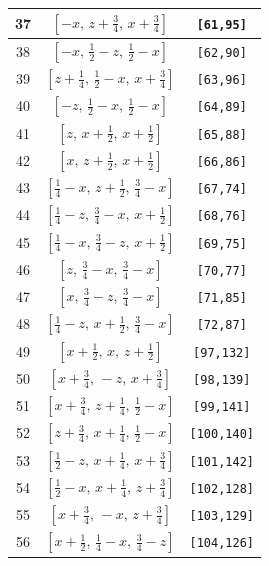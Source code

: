 \documentclass[fleqn,8pt]{jsarticle}
\begin{document}
\begin{longtable}{ccc}
37 & $\left[ - x,\, z + \frac{3}{4},\, x + \frac{3}{4} \right]$ & {\tt [61,95]} \\ \hline
38 & $\left[ - x,\, \frac{1}{2} - z,\, \frac{1}{2} - x \right]$ & {\tt [62,90]} \\ \hline
39 & $\left[ z + \frac{1}{4},\, \frac{1}{2} - x,\, x + \frac{3}{4} \right]$ & {\tt [63,96]} \\ \hline
40 & $\left[ - z,\, \frac{1}{2} - x,\, \frac{1}{2} - x \right]$ & {\tt [64,89]} \\ \hline
41 & $\left[ z,\, x + \frac{1}{2},\, x + \frac{1}{2} \right]$ & {\tt [65,88]} \\ \hline
42 & $\left[ x,\, z + \frac{1}{2},\, x + \frac{1}{2} \right]$ & {\tt [66,86]} \\ \hline
43 & $\left[ \frac{1}{4} - x,\, z + \frac{1}{2},\, \frac{3}{4} - x \right]$ & {\tt [67,74]} \\ \hline
44 & $\left[ \frac{1}{4} - z,\, \frac{3}{4} - x,\, x + \frac{1}{2} \right]$ & {\tt [68,76]} \\ \hline
45 & $\left[ \frac{1}{4} - x,\, \frac{3}{4} - z,\, x + \frac{1}{2} \right]$ & {\tt [69,75]} \\ \hline
46 & $\left[ z,\, \frac{3}{4} - x,\, \frac{3}{4} - x \right]$ & {\tt [70,77]} \\ \hline
47 & $\left[ x,\, \frac{3}{4} - z,\, \frac{3}{4} - x \right]$ & {\tt [71,85]} \\ \hline
48 & $\left[ \frac{1}{4} - z,\, x + \frac{1}{2},\, \frac{3}{4} - x \right]$ & {\tt [72,87]} \\ \hline
49 & $\left[ x + \frac{1}{2},\, x,\, z + \frac{1}{2} \right]$ & {\tt [97,132]} \\ \hline
50 & $\left[ x + \frac{3}{4},\, - z,\, x + \frac{3}{4} \right]$ & {\tt [98,139]} \\ \hline
51 & $\left[ x + \frac{3}{4},\, z + \frac{1}{4},\, \frac{1}{2} - x \right]$ & {\tt [99,141]} \\ \hline
52 & $\left[ z + \frac{3}{4},\, x + \frac{1}{4},\, \frac{1}{2} - x \right]$ & {\tt [100,140]} \\ \hline
53 & $\left[ \frac{1}{2} - z,\, x + \frac{1}{4},\, x + \frac{3}{4} \right]$ & {\tt [101,142]} \\ \hline
54 & $\left[ \frac{1}{2} - x,\, x + \frac{1}{4},\, z + \frac{3}{4} \right]$ & {\tt [102,128]} \\ \hline
55 & $\left[ x + \frac{3}{4},\, - x,\, z + \frac{3}{4} \right]$ & {\tt [103,129]} \\ \hline
56 & $\left[ x + \frac{1}{2},\, \frac{1}{4} - x,\, \frac{3}{4} - z \right]$ & {\tt [104,126]} \\ \hline

\end{longtable}
\end{document}
